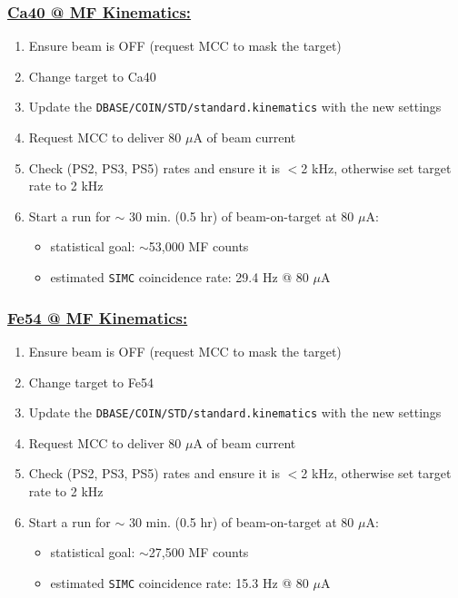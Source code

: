 \documentclass{article}
\begin{document}
\subsubsection*{\underline{Ca40 @ MF Kinematics:}}
\begin{enumerate}
\item Ensure beam is OFF (request MCC to mask the target)
\item Change target to Ca40
\item Update the \texttt{DBASE/COIN/STD/standard.kinematics} with the new settings
\item Request MCC to deliver 80 $\mu$A of beam current
\item Check (PS2, PS3, PS5) rates and ensure it is $<$2 kHz, otherwise set target rate to 2 kHz
\item Start a run for $\sim$ 30 min. (0.5 hr) of beam-on-target at 80 $\mu$A:
\begin{itemize}
    \item statistical goal: $\sim$53,000 MF counts
    \item estimated \texttt{SIMC} coincidence rate: 29.4 Hz @ 80 $\mu$A
\end{itemize}
\end{enumerate}

\subsubsection*{\underline{Fe54 @ MF Kinematics:}}
\begin{enumerate}
\item Ensure beam is OFF (request MCC to mask the target)
\item Change target to Fe54
\item Update the \texttt{DBASE/COIN/STD/standard.kinematics} with the new settings
\item Request MCC to deliver 80 $\mu$A of beam current
\item Check (PS2, PS3, PS5) rates and ensure it is $<$2 kHz, otherwise set target rate to 2 kHz
\item Start a run for $\sim$ 30 min. (0.5 hr) of beam-on-target at 80 $\mu$A:
\begin{itemize}
    \item statistical goal: $\sim$27,500 MF counts
    \item estimated \texttt{SIMC} coincidence rate: 15.3 Hz @ 80 $\mu$A
\end{itemize}
\end{enumerate}
\end{document}
